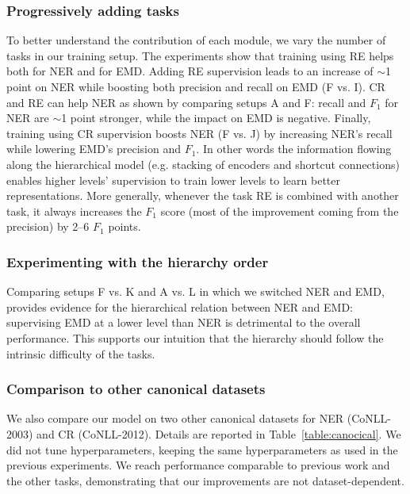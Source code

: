 \documentclass[letterpaper]{article}
\begin{document}
\subsubsection*{Progressively adding tasks}

To better understand the contribution of each module, we vary the number of tasks in our training setup. The experiments show that training using RE helps both for NER and for EMD. Adding RE supervision leads to an increase of $\sim$1 point on NER while boosting both precision and recall on EMD (F vs. I). CR and RE can help NER as shown by comparing setups A and F: recall and $F_{1}$ for NER are $\sim$1 point stronger, while the impact on EMD is negative. Finally, training using CR supervision boosts NER (F vs. J) by increasing NER's recall while lowering EMD's precision and $F_{1}$. In other words the information flowing along the hierarchical model (e.g. stacking of encoders and shortcut connections) enables higher levels' supervision to train lower levels to learn better representations. More generally, whenever the task RE is combined with another task, it always increases the $F_{1}$ score (most of the improvement coming from the precision) by 2--6 $F_{1}$ points.

\subsubsection*{Experimenting with the hierarchy order}

Comparing setups F vs. K and A vs. L in which we switched NER and EMD, provides evidence for the hierarchical relation between NER and EMD: supervising EMD at a lower level than NER is detrimental to the overall performance. This supports our intuition that the hierarchy should follow the intrinsic difficulty of the tasks.

\subsubsection*{Comparison to other canonical datasets}

We also compare our model on two other canonical datasets for NER (CoNLL-2003) and CR (CoNLL-2012). Details are reported in Table~\ref{table:canocical}. We did not tune hyperparameters, keeping the same hyperparameters as used in the previous experiments. We reach performance comparable to previous work and the other tasks, demonstrating that our improvements are not dataset-dependent.
\end{document}
